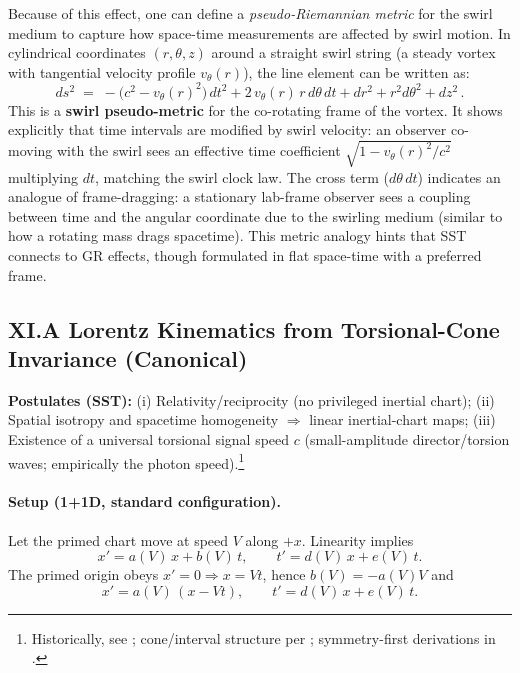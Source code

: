 \documentclass[10pt,reprint,aps,onecolumn,nofootinbib]{revtex4-2}
\begin{document}
        Because of this effect, one can define a \emph{pseudo-Riemannian metric} for the swirl medium to capture how space-time measurements are affected by swirl motion. In cylindrical coordinates $(r,\theta,z)$ around a straight swirl string (a steady vortex with tangential velocity profile $v_{\theta}(r)$), the line element can be written as:
        \[
            ds^2 \;=\; -\big(c^2 - v_{\theta}(r)^2\big)\,dt^2 + 2\,v_{\theta}(r)\,r\,d\theta\,dt + dr^2 + r^2 d\theta^2 + dz^2\,.
        \]
        This is a \textbf{swirl pseudo-metric} for the co-rotating frame of the vortex. It shows explicitly that time intervals are modified by swirl velocity: an observer co-moving with the swirl sees an effective time coefficient $\sqrt{1 - v_{\theta}(r)^2/c^2}$ multiplying $dt$, matching the swirl clock law. The cross term ($d\theta\,dt$) indicates an analogue of frame-dragging: a stationary lab-frame observer sees a coupling between time and the angular coordinate due to the swirling medium (similar to how a rotating mass drags spacetime). This metric analogy hints that SST connects to GR effects, though formulated in flat space-time with a preferred frame.


    \subsection*{XI.A \; Lorentz Kinematics from Torsional-Cone Invariance (Canonical)}
        \textbf{Postulates (SST):} (i) Relativity/reciprocity (no privileged inertial chart); (ii) Spatial isotropy and spacetime homogeneity $\Rightarrow$ linear inertial-chart maps; (iii) Existence of a universal torsional signal speed $c$ (small-amplitude director/torsion waves; empirically the photon speed).\footnote{Historically, see \cite{Einstein1905}; cone/interval structure per \cite{Minkowski1909}; symmetry-first derivations in \cite{LevyLeblond1976}.}

        \paragraph{Setup (1+1D, standard configuration).}
            Let the primed chart move at speed $V$ along $+x$. Linearity implies
            \begin{equation}
                x' = a(V)\,x + b(V)\,t,\qquad t' = d(V)\,x + e(V)\,t. \label{eq:lin}
            \end{equation}
            The primed origin obeys $x'=0 \Rightarrow x=Vt$, hence $b(V)=-a(V)V$ and
            \begin{equation}
                x' = a(V)\,(x - Vt), \qquad t' = d(V)\,x + e(V)\,t. \label{eq:std}
            \end{equation}
\end{document}
